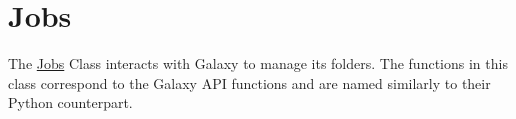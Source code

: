 \hypertarget{group__Jobs}{}\section{Jobs}
\label{group__Jobs}
The \hyperlink{classJobs}{Jobs} Class interacts with Galaxy to manage its folders. The functions in this class correspond to the Galaxy A\+PI functions and are named similarly to their Python counterpart. 